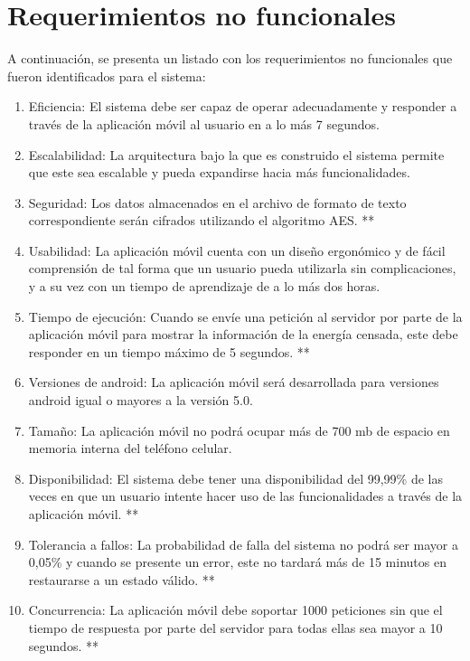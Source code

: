 \section{Requerimientos no funcionales}
A continuación, se presenta un listado con los requerimientos no funcionales que fueron identificados para el sistema:
\begin{enumerate}[label=RNF\arabic*.]
    \item Eficiencia: El sistema debe ser capaz de operar adecuadamente y responder a través de la aplicación móvil al usuario en a lo más 7 segundos.
	\item Escalabilidad: La arquitectura bajo la que es construido el sistema permite que este sea escalable y pueda expandirse hacia más funcionalidades.
	\item Seguridad: Los datos almacenados en el archivo de formato de texto correspondiente serán cifrados utilizando el algoritmo AES. **
	\item Usabilidad: La aplicación móvil cuenta con un diseño ergonómico y de fácil comprensión de tal forma que un usuario pueda utilizarla sin complicaciones, y a su vez con un tiempo de aprendizaje de a lo más dos horas.
	\item Tiempo de ejecución: Cuando se envíe una petición al servidor por parte de la aplicación móvil para mostrar la información de la energía censada, este debe responder en un tiempo máximo de 5 segundos. **
	\item Versiones de android: La aplicación móvil será desarrollada para versiones android igual o mayores a la versión 5.0.
	\item Tamaño: La aplicación móvil no podrá ocupar más de 700 mb de espacio en memoria interna del teléfono celular.
	\item Disponibilidad: El sistema debe tener una disponibilidad del 99,99\% de las veces en que un usuario intente hacer uso de las funcionalidades a través de la aplicación móvil. **
	\item Tolerancia a fallos: La probabilidad de falla del sistema no podrá ser mayor a 0,05\% y cuando se presente un error, este no tardará más de 15 minutos en restaurarse a un estado válido. **
	\item Concurrencia: La aplicación móvil debe soportar 1000 peticiones sin que el tiempo de respuesta por parte del servidor para todas ellas sea mayor a 10 segundos. **
\end{enumerate}